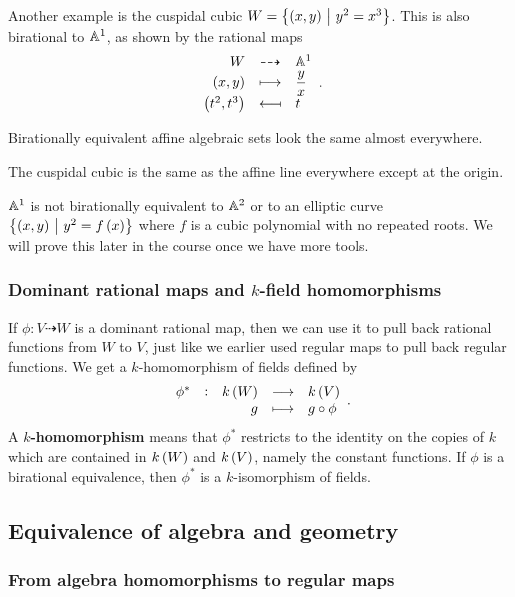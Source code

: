 \begin{example*}
Another example is the cuspidal cubic $ W = \cbr{\br{x, y} \st y^2 = x^3} $. This is also birational to $ \AA^1 $, as shown by the rational maps
$$ \birational{W}{\AA^1}{\br{x, y}}{\dfrac{y}{x}}{\br{t^2, t^3}}{t}. $$
\end{example*}

Birationally equivalent affine algebraic sets look the same almost everywhere.

\begin{example*}
The cuspidal cubic is the same as the affine line everywhere except at the origin.
\end{example*}

\begin{example*}
$ \AA^1 $ is not birationally equivalent to $ \AA^2 $ or to an elliptic curve $ \cbr{\br{x, y} \st y^2 = f\br{x}} $ where $ f $ is a cubic polynomial with no repeated roots. We will prove this later in the course once we have more tools.
\end{example*}

\subsubsection{Dominant rational maps and \texorpdfstring{$ k $}{k}-field homomorphisms}

If $ \phi : V \dashrightarrow W $ is a dominant rational map, then we can use it to pull back rational functions from $ W $ to $ V $, just like we earlier used regular maps to pull back regular functions. We get a $ k $-homomorphism of fields defined by
$$ \function[\phi^*]{k\br{W}}{k\br{V}}{g}{g \circ \phi}. $$
A \textbf{$ k $-homomorphism} means that $ \phi^* $ restricts to the identity on the copies of $ k $ which are contained in $ k\br{W} $ and $ k\br{V} $, namely the constant functions. If $ \phi $ is a birational equivalence, then $ \phi^* $ is a $ k $-isomorphism of fields.

\subsection{Equivalence of algebra and geometry}

\subsubsection{From algebra homomorphisms to regular maps}

